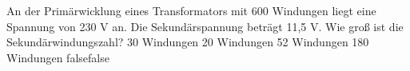     {An der Primärwicklung eines Transformators mit 600 Windungen liegt eine Spannung von 230 V an. Die Sekundärspannung beträgt 11,5 V. Wie groß ist die Sekundärwindungszahl?}
    {30 Windungen}
    {20 Windungen}
    {52 Windungen}
    {180 Windungen}
    {false}{false}